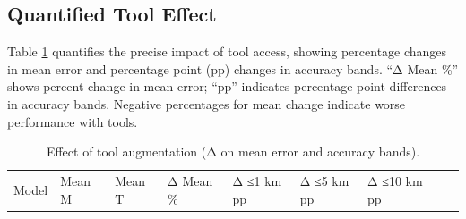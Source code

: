 \subsection{Quantified Tool
Effect}\label{d.2-quantified-tool-effect}

Table \ref{tbl:tool_effect} quantifies the precise impact of tool
access, showing percentage changes in mean error and percentage point
(pp) changes in accuracy bands. ``Δ Mean \%'' shows percent change in
mean error; ``pp'' indicates percentage point differences in accuracy
bands. Negative percentages for mean change indicate worse performance
with tools.

\begin{longtable}[]{@{}
  >{\raggedright\arraybackslash}p{}
  >{\raggedright\arraybackslash}p{}
  >{\raggedright\arraybackslash}p{}
  >{\raggedright\arraybackslash}p{}
  >{\raggedright\arraybackslash}p{}
  >{\raggedright\arraybackslash}p{}
  >{\raggedright\arraybackslash}p{}
  >{\raggedright\arraybackslash}p{}
  >{\raggedright\arraybackslash}p{}@{}}
\caption{\label{tbl:tool_effect}Effect of tool augmentation (Δ on mean
error and accuracy bands).}\tabularnewline
\toprule\noalign{}
\begin{minipage}[b]{\linewidth}\raggedright
Model
\end{minipage} & \begin{minipage}[b]{\linewidth}\raggedright
Mean M
\end{minipage} & \begin{minipage}[b]{\linewidth}\raggedright
Mean T
\end{minipage} & \begin{minipage}[b]{\linewidth}\raggedright
Δ Mean \%
\end{minipage} & \begin{minipage}[b]{\linewidth}\raggedright
Δ ≤1 km pp
\end{minipage} & \begin{minipage}[b]{\linewidth}\raggedright
Δ ≤5 km pp
\end{minipage} & \begin{minipage}[b]{\linewidth}\raggedright
Δ ≤10 km pp
\end{minipage} & \begin{minipage}[b]{\linewidth}\raggedright

\end{minipage}
\end{longtable}
